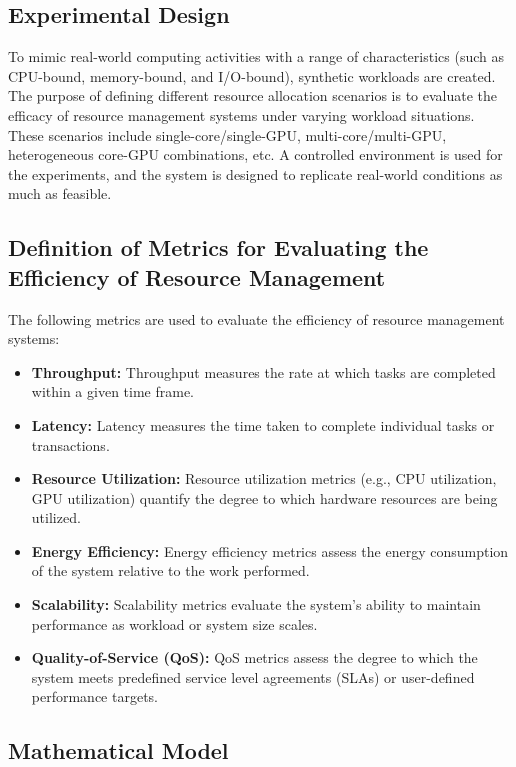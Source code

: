 \documentclass[16pt,a4paper]{article}
\begin{document}
\subsection{Experimental Design}

To mimic real-world computing activities with a range of characteristics (such as CPU-bound, memory-bound, and I/O-bound), synthetic workloads are created.  The purpose of defining different resource allocation scenarios is to evaluate the efficacy of resource management systems under varying workload situations.  These scenarios include single-core/single-GPU, multi-core/multi-GPU, heterogeneous core-GPU combinations, etc.  A controlled environment is used for the experiments, and the system is designed to replicate real-world conditions as much as feasible.

\subsection{Definition of Metrics for Evaluating the Efficiency of Resource Management}

The following metrics are used to evaluate the efficiency of resource management systems:

\begin{itemize}
  \item \textbf{Throughput:} Throughput measures the rate at which tasks are completed within a given time frame. 
  \item \textbf{Latency:} Latency measures the time taken to complete individual tasks or transactions. 
  \item \textbf{Resource Utilization:} Resource utilization metrics (e.g., CPU utilization, GPU utilization) quantify the degree to which hardware resources are being utilized. 
  \item \textbf{Energy Efficiency:} Energy efficiency metrics assess the energy consumption of the system relative to the work performed.
  \item \textbf{Scalability:} Scalability metrics evaluate the system's ability to maintain performance as workload or system size scales.
  \item \textbf{Quality-of-Service (QoS):} QoS metrics assess the degree to which the system meets predefined service level agreements (SLAs) or user-defined performance targets.
\end{itemize}

\subsection{Mathematical Model}
\end{document}
